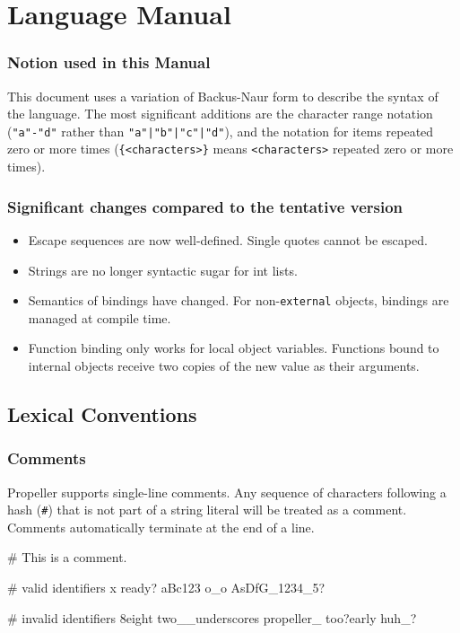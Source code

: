 \section{Language Manual}

\subsubsection{Notion used in this Manual}

This document uses a variation of Backus-Naur form to describe the syntax of the language. The most
significant additions are the character range notation (\verb|"a"-"d"| rather than
\verb:"a"|"b"|"c"|"d":), and the notation for items repeated zero or more times
(\verb|{<characters>}| means \verb|<characters>| repeated zero or more times).

\subsubsection{Significant changes compared to the tentative version}
\begin{itemize}
\item Escape sequences are now well-defined. Single quotes cannot be escaped.
\item Strings are no longer syntactic sugar for int lists.
\item Semantics of bindings have changed. For non-\texttt{external} objects, bindings are managed
at compile time.
\item Function binding only works for local object variables. Functions bound to internal objects receive two copies
      of the new value as their arguments.
\end{itemize}

\subsection{Lexical Conventions}

\subsubsection{Comments}
Propeller supports single-line comments. Any sequence of characters following a hash (\verb|#|)
that is not part of a string literal will be treated as a comment. Comments automatically terminate
at the end of a line.

\begin{mylisting}
# This is a comment.

# valid identifiers
x
ready?
aBc123
o_o
AsDfG_1234_5?

# invalid identifiers
8eight
two__underscores
propeller_
too?early
huh_?
\end{mylisting}


